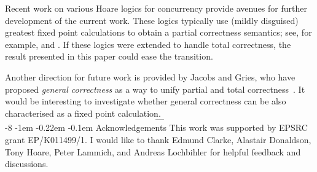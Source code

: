 \documentclass{llncs}
\makeatletter
\renewcommand\paragraph[1]{%
\@startsection{paragraph}{3}{\z@}%
{-8\p@ \@plus -4\p@ \@minus -4\p@}%
{-1em \@plus -0.22em \@minus -0.1em}%
{\normalfont\normalsize\bfseries\boldmath}{#1}}
\makeatother
\begin{document}
Recent work on various Hoare logics for concurrency provide avenues
for further development of the current work. These logics typically
use (mildly disguised) greatest fixed point calculations to obtain a
partial correctness semantics; see, for example,
\cite[Definition~3.2]{vafeiadis11} and
\cite[Definition~25]{dinsdale-young+13}. If these logics were extended
to handle total correctness, the result presented in this paper could
ease the transition.

Another direction for future work is provided by Jacobs and Gries, who
have proposed \emph{general correctness} as a way to unify partial and
total correctness~\cite{jacobs+85}. It would be interesting to
investigate whether general correctness can be also characterised as a
fixed point calculation.
\[
\text{---}
\]
\paragraph{Acknowledgements} This work was supported by EPSRC grant
EP/K011499/1. I would like to thank Edmund Clarke, Alastair Donaldson,
Tony Hoare, Peter Lammich, and Andreas Lochbihler for helpful feedback
and discussions.

\newpage


\end{document}
